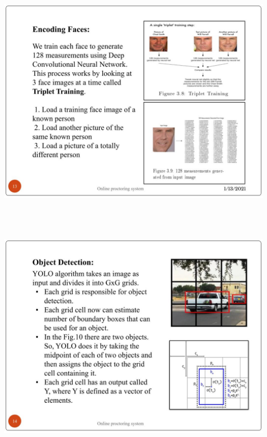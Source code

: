 \documentclass[12pt]{report}
\begin{document}
\includegraphics[width=17cm,height=12cm]{INTERNSHIP SAMPLE PRESENTATION (12)}\\
\includegraphics[width=17cm,height=12cm]{INTERNSHIP SAMPLE PRESENTATION (13)}\\
\end{document}
